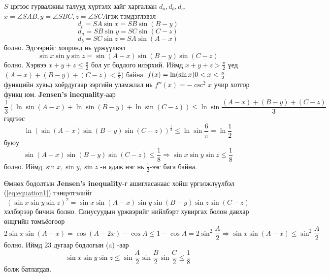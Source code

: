 \documentclass[10pt,a4paper,oneside]{book}
\begin{document}
\ASolution
$S$ цэгээс гурвалжны талууд хүртэлх зайг харгалзан $d_a, d_b, d_c$,  $x= \angle SAB, y=\angle SBC, z=\angle SCA$гэж тэмдэглэвэл
\begin{equation*}
d_c = SA\sin x = SB \sin (B-y)
\end{equation*}
\begin{equation*}
d_a = SB\sin y = SC \sin (C-z)
\end{equation*}
\begin{equation*}
d_b = SC\sin z = SA \sin (A-x)
\end{equation*}
болно. Эдгээрийг хооронд нь үржүүлвэл
\begin{equation}\label{eq:equation1}
\sin x\sin y\sin z = \sin (A-x)\sin(B-y)\sin(C-z)
\end{equation}
болно. Хэрвээ $x+y+z \leq \frac{\pi}{2}$ бол уг бодлого илэрхий. Иймд $x+y+z > \frac{\pi}{2}$ үед $(A-x) + (B-y) + (C-z) < \frac{\pi}{2}$) байна. $f(x) = \ln (\sin x) \vspace{0.5 cm} 0<x<\frac{\pi}{2}$ функцийн хувьд хоёрдугаар зэргийн уламжлал нь $f''(x) = -\csc^2 x$ учир хотгор функц юм. \textbf{Jensen's inequality}-аар
\begin{equation*}
\frac{1}{3}\left(\ln \sin (A-x) + \ln \sin (B-y) + \ln \sin(C-z)\right) \leq \ln \sin \frac{(A-x)+(B-y)+(C-z)}{3}
\end{equation*}
гэдгээс
\begin{equation*}
\ln(\sin(A-x)\sin(B-y)\sin(C-z))^\frac{1}{3} \leq \ln\sin \frac{6}{\pi} = \ln \frac{1}{2}
\end{equation*}
буюу
\begin{equation*}
\sin(A-x)\sin(B-y)\sin(C-z) \leq \frac{1}{8} \Rightarrow \sin x\sin y\sin z \leq \frac{1}{8}
\end{equation*}
болно. Иймд $\sin x, \sin y, \sin z$ -н ядаж нэг нь $\frac{1}{2}$-ээс бага байна.

\ASolution
Өмнөх бодолтын \textbf{Jensen's inequality}-г ашигласанаас хойш үргэлжлүүлбэл (\ref{eq:equation1}) тэнцэтгэлийг
\begin{equation*}
(\sin x \sin y\sin z)^2 = \sin x\sin (A-x)\sin y \sin(B-y)\sin z\sin(C-z)
\end{equation*}
хэлбэрээр бичиж болно. Синусуудын үржвэрийг нийлбэрт хувиргах болон давхар өнцгийн томъёогоор
\begin{equation*}
2\sin x \sin(A-x) = \cos (A-2x) - \cos A \leq 1 -\cos A = 2\sin^2 \frac{A}{2} \Rightarrow \sin x\sin(A-x) \leq \sin^2\frac{A}{2}
\end{equation*}
болно. Иймд 23 дугаар бодлогын (a) -аар 
\begin{equation*}
\sin x \sin y\sin z \leq \sin \frac{A}{2} \sin \frac{B}{2} \sin \frac{C}{2} \leq \frac{1}{8}
\end{equation*}
болж батлагдав.
\end{document}

